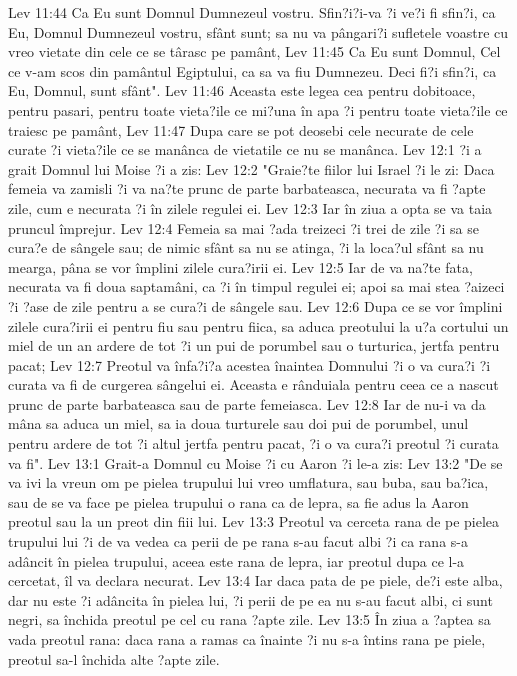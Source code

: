 Lev 11:44  Ca Eu sunt Domnul Dumnezeul vostru. Sfin?i?i-va ?i ve?i fi sfin?i, ca Eu, Domnul Dumnezeul vostru, sfânt sunt; sa nu va pângari?i sufletele voastre cu vreo vietate din cele ce se târasc pe pamânt,
Lev 11:45  Ca Eu sunt Domnul, Cel ce v-am scos din pamântul Egiptului, ca sa va fiu Dumnezeu. Deci fi?i sfin?i, ca Eu, Domnul, sunt sfânt".
Lev 11:46  Aceasta este legea cea pentru dobitoace, pentru pasari, pentru toate vieta?ile ce mi?una în apa ?i pentru toate vieta?ile ce traiesc pe pamânt,
Lev 11:47  Dupa care se pot deosebi cele necurate de cele curate ?i vieta?ile ce se manânca de vietatile ce nu se manânca.
Lev 12:1  ?i a grait Domnul lui Moise ?i a zis:
Lev 12:2  "Graie?te fiilor lui Israel ?i le zi: Daca femeia va zamisli ?i va na?te prunc de parte barbateasca, necurata va fi ?apte zile, cum e necurata ?i în zilele regulei ei.
Lev 12:3  Iar în ziua a opta se va taia pruncul împrejur.
Lev 12:4  Femeia sa mai ?ada treizeci ?i trei de zile ?i sa se cura?e de sângele sau; de nimic sfânt sa nu se atinga, ?i la loca?ul sfânt sa nu mearga, pâna se vor împlini zilele cura?irii ei.
Lev 12:5  Iar de va na?te fata, necurata va fi doua saptamâni, ca ?i în timpul regulei ei; apoi sa mai stea ?aizeci ?i ?ase de zile pentru a se cura?i de sângele sau.
Lev 12:6  Dupa ce se vor împlini zilele cura?irii ei pentru fiu sau pentru fiica, sa aduca preotului la u?a cortului un miel de un an ardere de tot ?i un pui de porumbel sau o turturica, jertfa pentru pacat;
Lev 12:7  Preotul va înfa?i?a acestea înaintea Domnului ?i o va cura?i ?i curata va fi de curgerea sângelui ei. Aceasta e rânduiala pentru ceea ce a nascut prunc de parte barbateasca sau de parte femeiasca.
Lev 12:8  Iar de nu-i va da mâna sa aduca un miel, sa ia doua turturele sau doi pui de porumbel, unul pentru ardere de tot ?i altul jertfa pentru pacat, ?i o va cura?i preotul ?i curata va fi".
Lev 13:1  Grait-a Domnul cu Moise ?i cu Aaron ?i le-a zis:
Lev 13:2  "De se va ivi la vreun om pe pielea trupului lui vreo umflatura, sau buba, sau ba?ica, sau de se va face pe pielea trupului o rana ca de lepra, sa fie adus la Aaron preotul sau la un preot din fiii lui.
Lev 13:3  Preotul va cerceta rana de pe pielea trupului lui ?i de va vedea ca perii de pe rana s-au facut albi ?i ca rana s-a adâncit în pielea trupului, aceea este rana de lepra, iar preotul dupa ce l-a cercetat, îl va declara necurat.
Lev 13:4  Iar daca pata de pe piele, de?i este alba, dar nu este ?i adâncita în pielea lui, ?i perii de pe ea nu s-au facut albi, ci sunt negri, sa închida preotul pe cel cu rana ?apte zile.
Lev 13:5  În ziua a ?aptea sa vada preotul rana: daca rana a ramas ca înainte ?i nu s-a întins rana pe piele, preotul sa-l închida alte ?apte zile.
